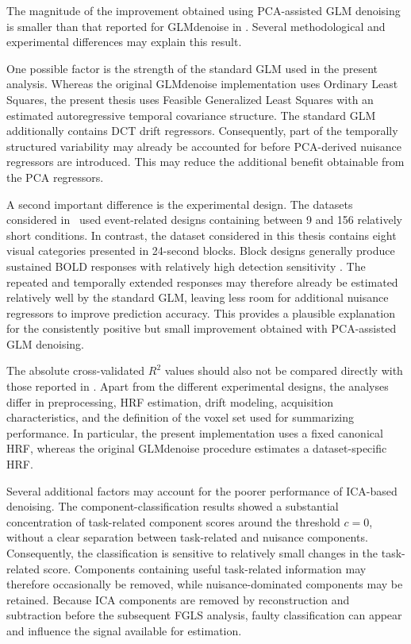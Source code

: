 \documentclass[english]{pwr_wmat_praca_dyplomowa}
\theoremstyle{definition}
\theoremstyle{remark}
\begin{document}
The magnitude of the improvement obtained using PCA-assisted GLM denoising is smaller than that reported for GLMdenoise in \cite{glm-denoise}. Several methodological and experimental differences may explain this result. 

One possible factor is the strength of the standard GLM used in the present analysis. Whereas the original GLMdenoise implementation uses Ordinary Least Squares, the present thesis uses Feasible Generalized Least Squares with an estimated autoregressive temporal covariance structure. The standard GLM additionally contains DCT drift regressors. Consequently, part of the temporally structured variability may already be accounted for before PCA-derived nuisance regressors are introduced. This may reduce the additional benefit obtainable from the PCA regressors. 

A second important difference is the experimental design. The datasets considered in~\cite{glm-denoise} used event-related designs containing between 9 and 156 relatively short conditions. In contrast, the dataset considered in this thesis contains eight visual categories presented in 24-second blocks. Block designs generally produce sustained BOLD responses with relatively high detection sensitivity \cite{glm-denoise}. The repeated and temporally extended responses may therefore already be estimated relatively well by the standard GLM, leaving less room for additional nuisance regressors to improve prediction accuracy. This provides a plausible explanation for the consistently positive but small improvement obtained with PCA-assisted GLM denoising.

The absolute cross-validated $R^2$ values should also not be compared directly with those reported in \cite{glm-denoise}. Apart from the different experimental designs, the analyses differ in preprocessing, HRF estimation, drift modeling, acquisition characteristics, and the definition of the voxel set used for summarizing performance. In particular, the present implementation uses a fixed canonical HRF, whereas the original GLMdenoise procedure estimates a dataset-specific HRF. 

Several additional factors may account for the poorer performance of ICA-based denoising. The component-classification results showed a substantial concentration of task-related component scores around the threshold $c=0$, without a clear separation between task-related and nuisance components. Consequently, the classification is sensitive to relatively small changes in the task-related score. Components containing useful task-related information may therefore occasionally be removed, while nuisance-dominated components may be retained. Because ICA components are removed by reconstruction and subtraction before the subsequent FGLS analysis, faulty classification can appear and influence the signal available for estimation.
\end{document}

